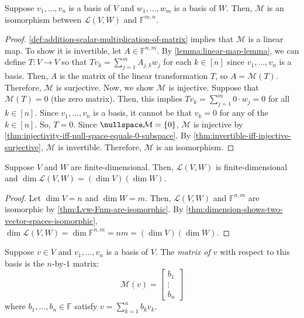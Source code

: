 \documentclass{article}
\begin{document}
\begin{theorem}
  \label{thm:Lvw-Fnm-are-isomorphic}
  Suppose $v_1, ..., v_n$ is a basis of $V$ and $w_1, ..., w_m$ is a
  basis of $W$. Then, $\mathcal{M}$ is an isomorphism between
  $\mathcal{L}(V, W)$ and $\mathbb{F}^{m, n}$.
\end{theorem}
\begin{proof}
  \cref{def:addition-scalar-multiplication-of-matrix} implies that
  $\mathcal{M}$ is a linear map. To show it is invertible, let $A \in
  \mathbb{F}^{n, m}$. By \cref{lemma:linear-map-lemma}, we can define
  $T: V \rightarrow V$ so that $Tv_k = \sum_{j=1}^m A_{j, k} w_j$ for
  each $k \in [n]$ since $v_1, ..., v_n$ is a basis. Then, $A$ is the
  matrix of the linear transformation $T$, so $A =
  \mathcal{M}(T)$. Therefore, $\mathcal{M}$ is surjective. Now, we
  show $\mathcal{M}$ is injective. Suppose that $\mathcal{M}(T) = 0$
  (the zero matrix). Then, this implies $Tv_k = \sum_{j=1}^m 0 \cdot
  w_j = 0$ for all $k \in [n]$. Since $v_1, ..., v_n$ is a basis, it
  cannot be that $v_k = 0$ for any of the $k \in [n]$. So, $T =
  0$. Since $\nullspace \mathcal{M} = \{0\}$, $\mathcal{M}$ is
  injective by
  \cref{thm:injectivity-iff-null-space-equals-0-subspace}. By
  \cref{thm:invertible-iff-injective-surjective}, $\mathcal{M}$ is
  invertible. Therefore, $\mathcal{M}$ is an isomorphism.
\end{proof}

\begin{theorem}[$\dim \mathcal{L}(V, W) = (\dim V)(\dim W)$]
  \label{thm:Lvw-finite-dim-if-V-W-finite-dim}
  Suppose $V$ and $W$ are finite-dimensional. Then, $\mathcal{L}(V,
  W)$ is finite-dimensional and $\dim \mathcal{L}(V, W) = (\dim
  V)(\dim W)$.
\end{theorem}
\begin{proof}
  Let $\dim V = n$ and $\dim W = m$. Then, $\mathcal{L}(V, W)$ and
  $\mathbb{F}^{n, m}$ are isomorphic by
  \cref{thm:Lvw-Fnm-are-isomorphic}. By
  \cref{thm:dimension-shows-two-vector-spaces-isomorphic}, $\dim
  \mathcal{L}(V, W) = \dim \mathbb{F}^{n, m} = nm = (\dim V)(\dim W)$.
\end{proof}

\begin{definition}
  \label{def:matrix-of-vector}
  Suppose $v \in V$ and $v_1, ..., v_n$ is a basis of $V$. The
  \textit{matrix of $v$} with respect to this basis is the $n$-by-$1$
  matrix:
  \[
    \mathcal{M}(v) = \begin{bmatrix}
      b_1 \\
      \vdots \\
      b_n
    \end{bmatrix}
  \]
  where $b_1, ..., b_n \in \mathbb{F}$ satisfy $v = \sum_{k=1}^n b_k v_k$.
\end{definition}
\end{document}
